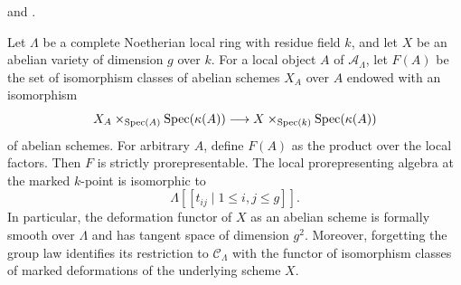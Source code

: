 \begin{lemma}
\label{lemma-abelian-variety-formal-moduli-smooth}
\begin{reference}
\cite[Expos\'e 195, C, remarks following Proposition 4.1,
pp. 386--387]{FGA} and
\cite[Theorem 2.2.1, pp. 273--280]{Oort-local-moduli}.
\end{reference}
Let $\Lambda$ be a complete Noetherian local ring with residue field $k$,
and let $X$ be an abelian variety of dimension $g$ over $k$. For a local
object $A$ of $\mathcal{A}_\Lambda$, let $F(A)$ be the set of isomorphism
classes of abelian schemes $X_A$ over $A$ endowed with an isomorphism
$$
X_A \times_{\mathop{\mathrm{Spec}}(A)} \mathop{\mathrm{Spec}}(\kappa(A))
\longrightarrow
X \times_{\mathop{\mathrm{Spec}}(k)} \mathop{\mathrm{Spec}}(\kappa(A))
$$
of abelian schemes. For arbitrary $A$, define $F(A)$ as the product over
the local factors. Then $F$ is strictly prorepresentable. The local
prorepresenting algebra at the marked $k$-point is isomorphic to
$$
\Lambda[[t_{ij} \mid 1 \leq i, j \leq g]].
$$
In particular, the deformation functor of $X$ as an abelian scheme is
formally smooth over $\Lambda$ and has tangent space of dimension $g^2$.
Moreover, forgetting the group law identifies its restriction to
$\mathcal{C}_\Lambda$ with the functor of isomorphism classes of marked
deformations of the underlying scheme $X$.
\end{lemma}

